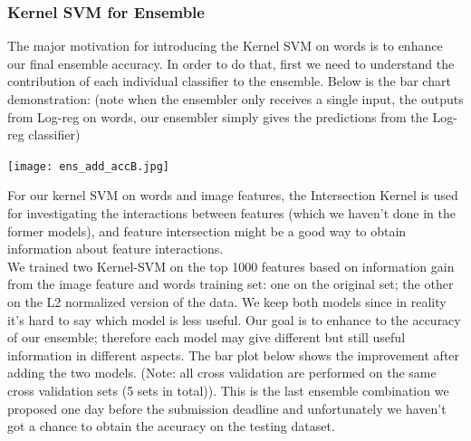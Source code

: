 \subsubsection{Kernel SVM for Ensemble}
\label{kernelsvmensemble}
The major motivation for introducing the Kernel SVM on words is to enhance our final ensemble accuracy. In order to do that, first we need to understand the contribution of each individual classifier to the ensemble. Below is the bar chart demonstration: (note when the ensembler only receives a single input, the outputs from Log-reg on words, our ensembler simply gives the predictions from the Log-reg classifier)\\
 \begin{center}
 \texttt{[image: ens\_add\_accB.jpg]}
     \end{center}
For our kernel SVM on words and image features, the Intersection Kernel is used for investigating the interactions between features (which we haven't done in the former models), and feature intersection might be a good way to obtain information about feature interactions.\\
We trained two Kernel-SVM on the top 1000  features based on information gain from the image feature and words training set: one on the original set; the other on the L2 normalized version of the data. We keep both models since in reality it's hard to say which model is less useful. Our goal is to enhance to the accuracy of our ensemble; therefore each model may give different but still useful information in different aspects. The bar plot below shows the improvement after adding the two models. (Note: all cross validation are performed on the same cross validation sets (5 sets in total)). This is the last ensemble combination we proposed one day before the submission deadline and unfortunately we haven't got a chance to obtain the accuracy on the testing dataset.\\

